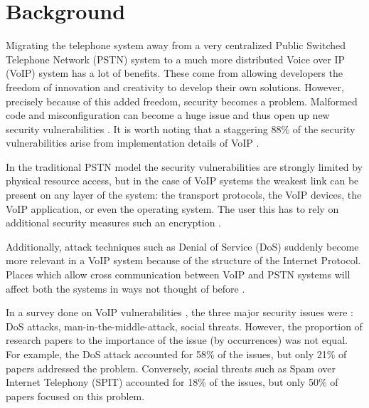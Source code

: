 \section{Background}

Migrating the telephone system away from a very centralized Public Switched Telephone Network (PSTN) system to a much more distributed Voice over IP (VoIP) system has a lot of benefits. These come from allowing developers the freedom of innovation and creativity to develop their own solutions. However, precisely because of this added freedom, security becomes a problem. Malformed code and misconfiguration can become a huge issue and thus open up new security vulnerabilities \cite{voipbg}. It is worth noting that a staggering 88\% of the security vulnerabilities arise from implementation details of VoIP \cite{keromytis}.

In the traditional PSTN model the security vulnerabilities are strongly limited by physical resource access, but in the case of VoIP systems the weakest link can be present on any layer of the system: the transport protocols, the VoIP devices, the VoIP application, or even the operating system. The user this has to rely on additional security measures such an encryption \cite{voipbg}. 

Additionally, attack techniques such as Denial of Service (DoS) suddenly become more relevant in a VoIP system because of the structure of the Internet Protocol. Places which allow cross communication between VoIP and PSTN systems will affect both the systems in ways not thought of before \cite{voipbg}.

In a survey done on VoIP vulnerabilities \cite{keromytis}, the three major security issues were : DoS attacks, man-in-the-middle-attack, social threats. However, the proportion of research papers to the importance of the issue (by occurrences) was not equal. For example, the DoS attack accounted for 58\% of the issues, but only 21\% of papers addressed the problem. Conversely, social threats such as Spam over Internet Telephony (SPIT) accounted for 18\% of the issues, but only 50\% of papers focused on this problem. 

